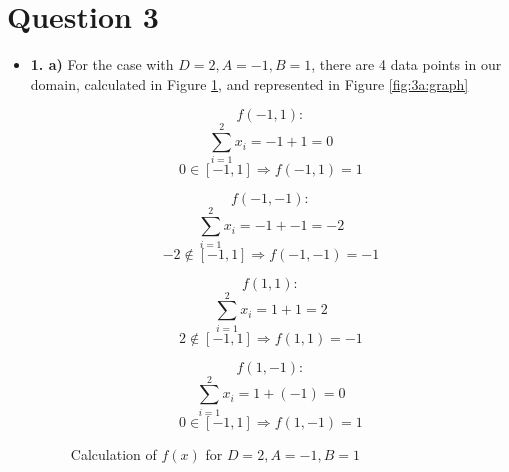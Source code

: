 \documentclass[12pt]{article}
\begin{document}
\section*{Question 3}
\begin{itemize}
    \item \textbf{1. a)} For the case with $D=2, A=-1, B=1$, there are 4 data points in our domain, calculated in Figure \ref{fig:3a:calc}, and represented in Figure \ref{fig:3a:graph}

        \begin{figure}[H]
        \begin{minipage}{0.5\linewidth}
            \begin{equation*}
                f(-1, 1):
            \end{equation*}
            \begin{equation*}
                \sum_{i=1}^{2} x_i = -1 + 1 = 0
            \end{equation*}
            \begin{equation*}
                0 \in [-1, 1] \Rightarrow f(-1, 1) = 1
            \end{equation*}

            \begin{equation*}
                f(-1, -1):
            \end{equation*}
            \begin{equation*}
                \sum_{i=1}^{2} x_i = -1 + -1 = -2
            \end{equation*}
            \begin{equation*}
                -2 \notin [-1, 1] \Rightarrow f(-1, -1) = -1
            \end{equation*}
        \end{minipage}
        \begin{minipage}{0.5\linewidth}
            \begin{equation*}
                f(1, 1):
            \end{equation*}
            \begin{equation*}
                \sum_{i=1}^{2} x_i = 1 + 1 = 2
            \end{equation*}
            \begin{equation*}
                2 \notin [-1, 1] \Rightarrow f(1, 1) = -1
            \end{equation*}

            \begin{equation*}
                f(1, -1):
            \end{equation*}
            \begin{equation*}
                \sum_{i=1}^{2} x_i = 1 + (-1) = 0
            \end{equation*}
            \begin{equation*}
                0 \in [-1, 1] \Rightarrow f(1, -1) = 1
            \end{equation*}
        \end{minipage}
            \caption{Calculation of $f(x)$ for $D=2, A=-1, B=1$}
            \label{fig:3a:calc}
        \end{figure}


\end{itemize}
\end{document}
